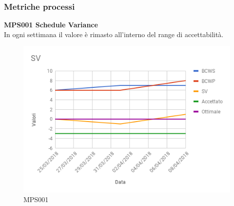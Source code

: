 \documentclass[PianoDiQualifica.tex]{subfiles}
\begin{document}
\subsubsection{Metriche processi}

\textbf{MPS001 Schedule Variance}\\
In ogni settimana il valore è rimasto all'interno del range di accettabilità.
\begin{figure}[htb]
	\centering
	\includegraphics[width=0.7\linewidth]{RQ/SV}
	\caption{MPS001}
	\label{fig:processi}
\end{figure}
\newpage
\end{document}
